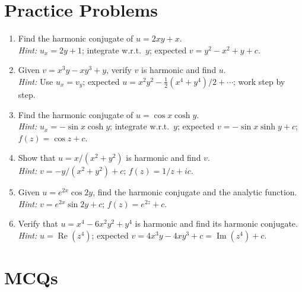\documentclass[12pt,a4paper]{article}
\begin{document}
\section{Practice Problems}

\begin{enumerate}[label=\textbf{P\arabic*.}]

\item Find the harmonic conjugate of $u=2xy+x$.\\
      \textit{Hint:} $u_x=2y+1$; integrate w.r.t.\ $y$; expected $v=y^2-x^2+y+c$.

\item Given $v=x^3y-xy^3+y$, verify $v$ is harmonic and find $u$.\\
      \textit{Hint:} Use $u_x=v_y$; expected $u=x^2y^2-\tfrac{1}{2}(x^4+y^4)/2+\cdots$;
      work step by step.

\item Find the harmonic conjugate of $u=\cos x\cosh y$.\\
      \textit{Hint:} $u_x=-\sin x\cosh y$; integrate w.r.t.\ $y$; expected
      $v=-\sin x\sinh y+c$; $f(z)=\cos z+c$.

\item Show that $u=x/(x^2+y^2)$ is harmonic and find $v$.\\
      \textit{Hint:} $v=-y/(x^2+y^2)+c$; $f(z)=1/z+ic$.

\item Given $u=e^{2x}\cos 2y$, find the harmonic conjugate and the analytic function.\\
      \textit{Hint:} $v=e^{2x}\sin 2y+c$; $f(z)=e^{2z}+c$.

\item Verify that $u=x^4-6x^2y^2+y^4$ is harmonic and find its harmonic conjugate.\\
      \textit{Hint:} $u=\operatorname{Re}(z^4)$; expected $v=4x^3y-4xy^3+c=\operatorname{Im}(z^4)+c$.

\end{enumerate}

\section{MCQs}
\end{document}
